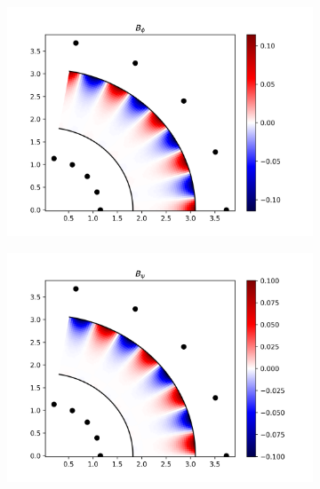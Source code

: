 \begin{figure}[H]
	\centering
	\begin{subfigure}[t]{0.3\textwidth}
		\centering
		\includegraphics[width=1\textwidth]{schemes/rippleBphi.png}
		\label{fig:Bpert_phi}
	\end{subfigure}
	\begin{subfigure}[t]{0.3\textwidth}
		\centering
		\includegraphics[width=1\textwidth]{schemes/rippleBpsi.png}
		\label{fig:Bpert_psi}
	\end{subfigure}
	\begin{subfigure}[t]{0.3\textwidth}
		\centering

\end{subfigure}
\end{figure}
